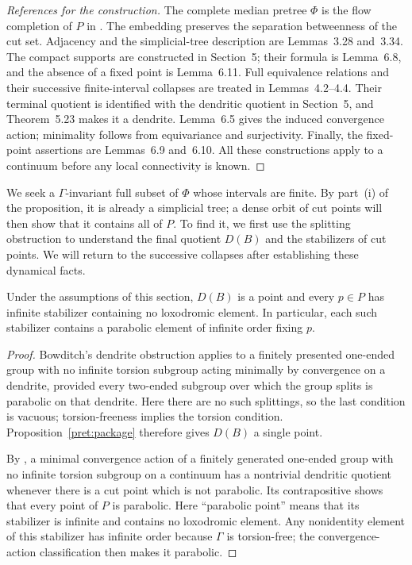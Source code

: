 \begin{proof}[References for the construction]
The complete median pretree $\Phi$ is the flow completion of $P$ in
\cite[Theorem~3.19]{Bowditch1999Treelike}.  The embedding preserves the
separation betweenness of the cut set.  Adjacency and the simplicial-tree
description are Lemmas~3.28 and~3.34.  The compact supports are constructed
in Section~5; their formula is Lemma~6.8, and the absence of a fixed point
is Lemma~6.11.  Full equivalence relations and their successive
finite-interval collapses are treated in Lemmas~4.2--4.4.  Their terminal
quotient is identified with the dendritic quotient in Section~5, and
Theorem~5.23 makes it a dendrite.  Lemma~6.5 gives the induced convergence
action; minimality follows from equivariance and surjectivity.  Finally,
the fixed-point assertions are Lemmas~6.9 and~6.10.  All these constructions
apply to a continuum before any local connectivity is known.
\end{proof}

We seek a $\Gamma$-invariant full subset of $\Phi$ whose intervals are
finite. By part~\textup{(i)} of the proposition, it is already a
simplicial tree; a dense orbit of cut points will then show that it
contains all of $P$. To find it, we first use the splitting obstruction
to understand the final quotient $D(B)$ and the stabilizers of cut
points. We will return to the successive collapses after establishing
these dynamical facts.

\begin{lemma}\label{pret:parabolic-cuts}
Under the assumptions of this section, $D(B)$ is a point and every
$p\in P$ has infinite stabilizer containing no loxodromic element.
In particular, each such stabilizer contains a parabolic element of
infinite order fixing $p$.
\end{lemma}

\begin{proof}
Bowditch's dendrite obstruction
\cite[Lemma~1.4]{Bowditch1999Connected} applies to a finitely presented
one-ended group with no infinite torsion subgroup acting minimally by
convergence on a dendrite, provided every two-ended subgroup over which
the group splits is parabolic on that dendrite.  Here there are no such
splittings, so the last condition is vacuous; torsion-freeness implies
the torsion condition.  Proposition~\ref{pret:package} therefore gives
$D(B)$ a single point.

By \cite[Theorem~6.1]{Bowditch1999Treelike}, a minimal convergence action
of a finitely generated one-ended group with no infinite torsion subgroup
on a continuum has a nontrivial dendritic quotient whenever there is a
cut point which is not parabolic.
Its contrapositive shows that every point of $P$ is parabolic.  Here
``parabolic point'' means that its stabilizer is infinite and contains no
loxodromic element.  Any nonidentity element of this stabilizer has
infinite order because $\Gamma$ is torsion-free; the convergence-action
classification then makes it parabolic.
\end{proof}

